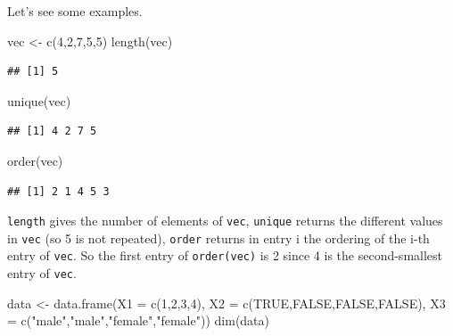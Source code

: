 \documentclass[
]{book}
\newenvironment{Shaded}{\begin{snugshade}}{\end{snugshade}}
\newcommand{\AttributeTok}[1]{\textcolor[rgb]{0.77,0.63,0.00}{#1}}
\newcommand{\ConstantTok}[1]{\textcolor[rgb]{0.00,0.00,0.00}{#1}}
\newcommand{\DecValTok}[1]{\textcolor[rgb]{0.00,0.00,0.81}{#1}}
\newcommand{\FunctionTok}[1]{\textcolor[rgb]{0.00,0.00,0.00}{#1}}
\newcommand{\NormalTok}[1]{#1}
\newcommand{\OtherTok}[1]{\textcolor[rgb]{0.56,0.35,0.01}{#1}}
\newcommand{\StringTok}[1]{\textcolor[rgb]{0.31,0.60,0.02}{#1}}
\begin{document}
Let's see some examples.

\begin{Shaded}
\begin{Highlighting}[]
\NormalTok{vec }\OtherTok{\textless{}{-}} \FunctionTok{c}\NormalTok{(}\DecValTok{4}\NormalTok{,}\DecValTok{2}\NormalTok{,}\DecValTok{7}\NormalTok{,}\DecValTok{5}\NormalTok{,}\DecValTok{5}\NormalTok{)}
\FunctionTok{length}\NormalTok{(vec)}
\end{Highlighting}
\end{Shaded}

\begin{verbatim}
## [1] 5
\end{verbatim}

\begin{Shaded}
\begin{Highlighting}[]
\FunctionTok{unique}\NormalTok{(vec)}
\end{Highlighting}
\end{Shaded}

\begin{verbatim}
## [1] 4 2 7 5
\end{verbatim}

\begin{Shaded}
\begin{Highlighting}[]
\FunctionTok{order}\NormalTok{(vec)}
\end{Highlighting}
\end{Shaded}

\begin{verbatim}
## [1] 2 1 4 5 3
\end{verbatim}

\texttt{length} gives the number of elements of \texttt{vec}, \texttt{unique} returns the different values in \texttt{vec} (so 5 is not repeated), \texttt{order} returns in entry i the ordering of the i-th entry of \texttt{vec}. So the first entry of \texttt{order(vec)} is 2 since 4 is the second-smallest entry of \texttt{vec}.

\begin{Shaded}
\begin{Highlighting}[]
\NormalTok{data }\OtherTok{\textless{}{-}} \FunctionTok{data.frame}\NormalTok{(}\AttributeTok{X1 =} \FunctionTok{c}\NormalTok{(}\DecValTok{1}\NormalTok{,}\DecValTok{2}\NormalTok{,}\DecValTok{3}\NormalTok{,}\DecValTok{4}\NormalTok{), }\AttributeTok{X2 =} \FunctionTok{c}\NormalTok{(}\ConstantTok{TRUE}\NormalTok{,}\ConstantTok{FALSE}\NormalTok{,}\ConstantTok{FALSE}\NormalTok{,}\ConstantTok{FALSE}\NormalTok{),}
                   \AttributeTok{X3 =} \FunctionTok{c}\NormalTok{(}\StringTok{"male"}\NormalTok{,}\StringTok{"male"}\NormalTok{,}\StringTok{"female"}\NormalTok{,}\StringTok{"female"}\NormalTok{))}
\FunctionTok{dim}\NormalTok{(data)}
\end{Highlighting}
\end{Shaded}
\end{document}
